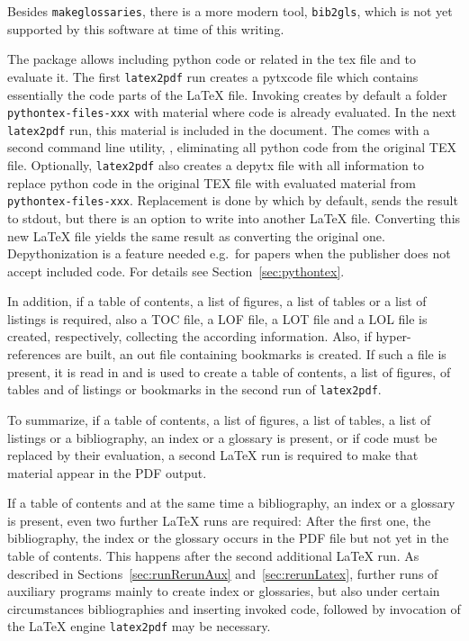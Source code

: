 Besides \texttt{makeglossaries}, there is a more modern tool, 
\texttt{bib2gls}, which is not yet supported by this software 
at time of this writing. 

The package  allows including python code or related 
in the \gls{tex} file and to evaluate it. 
The first \texttt{latex2pdf} run creates a \gls{pytxcode} file 
which contains essentially the code parts of the \LaTeX{} file. 
Invoking  creates by default 
a folder \texttt{pythontex-files-xxx} 
with material where code is already evaluated. 
In the next \texttt{latex2pdf} run, this material is included in the document. 
The  comes with a second command line utility, 
, eliminating all python code from the original TEX file. 
Optionally, \texttt{latex2pdf} also creates a \gls{depytx} file 
with all information to replace python code in the original TEX file 
with evaluated material from \texttt{pythontex-files-xxx}. 
Replacement is done by  
which by default, sends the result to stdout, 
but there is an option to write into another \LaTeX{} file. 
Converting this new \LaTeX{} file 
yields the same result as converting the original one. 
Depythonization is a feature needed e.g.~for papers 
when the publisher does not accept included code. 
For details see Section~\ref{sec:pythontex}. 

In addition, if
a table of contents, a list of figures, a list of tables 
or a list of listings is required, 
also a TOC file, a LOF file, a LOT file and a LOL file is created,
respectively, 
collecting the according information. 
Also, if hyper-references are built, an \gls{out} file 
containing bookmarks is created. 
If such a file is present, it is read in and is used
to create a table of contents, a list of figures, of tables and of listings 
or bookmarks in the second run of \texttt{latex2pdf}. 

To summarize, 
if a table of contents, a list of figures, a list of tables, a list of listings or 
a bibliography, an index or a glossary is present, 
or if code must be replaced by their evaluation, 
a second \LaTeX{} run is required to make that material appear in the PDF output. 

If a table of contents and at the same time 
a bibliography, an index or a glossary is present, 
even two further \LaTeX{} runs are required: 
After the first one, the bibliography, the index or the glossary 
occurs in the PDF file but not yet in the table of contents. 
This happens after the second additional \LaTeX{} run. 
As described in Sections~\ref{sec:runRerunAux} and~\ref{sec:rerunLatex}, 
further runs of auxiliary programs mainly to create index or glossaries, 
but also under certain circumstances bibliographies and inserting invoked code, 
followed by invocation of the \LaTeX{} engine \texttt{latex2pdf} may be necessary. 

